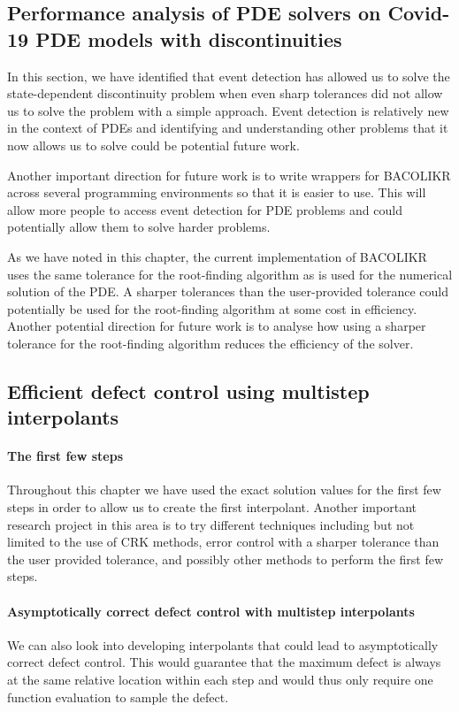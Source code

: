 \documentclass{report}
\begin{document}
\subsection{Performance analysis of PDE solvers on Covid-19 PDE models with discontinuities}
In this section, we have identified that event detection has allowed us to solve the state-dependent discontinuity problem when even sharp tolerances did not allow us to solve the problem with a simple approach. Event detection is relatively new in the context of PDEs and identifying and understanding other problems that it now allows us to solve could be potential future work.

Another important direction for future work is to write wrappers for BACOLIKR across several programming environments so that it is easier to use. This will allow more people to access event detection for PDE problems and could potentially allow them to solve harder problems. 

As we have noted in this chapter, the current implementation of BACOLIKR uses the same tolerance for the root-finding algorithm as is used for the numerical solution of the PDE. A sharper tolerances than the user-provided tolerance could potentially be used for the root-finding algorithm at some cost in efficiency. Another potential direction for future work is to analyse how using a sharper tolerance for the root-finding algorithm reduces the efficiency of the solver.

\subsection{Efficient defect control using multistep interpolants}
\label{section:HB_future_work}

\paragraph{The first few steps}
Throughout this chapter we have used the exact solution values for the first few steps in order to allow us to create the first interpolant. Another important research project in this area is to try different techniques including but not limited to the use of CRK methods, error control with a sharper tolerance than the user provided tolerance, and possibly other methods to perform the first few steps.

\paragraph{Asymptotically correct defect control with multistep interpolants}
We can also look into developing interpolants that could lead to asymptotically correct defect control. This would guarantee that the maximum defect is always at the same relative location within each step and would thus only require one function evaluation to sample the defect.
\end{document}
